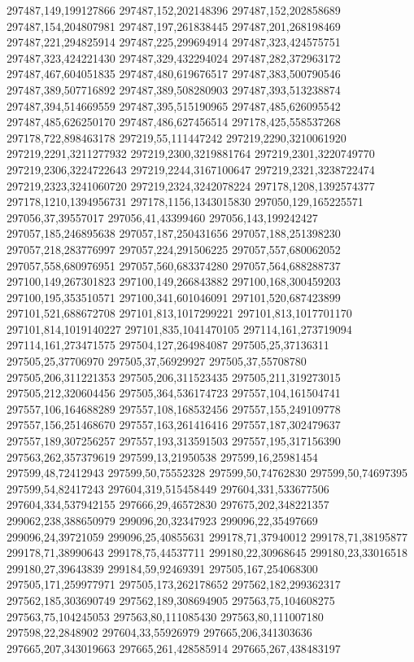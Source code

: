 297487,149,199127866
297487,152,202148396
297487,152,202858689
297487,154,204807981
297487,197,261838445
297487,201,268198469
297487,221,294825914
297487,225,299694914
297487,323,424575751
297487,323,424221430
297487,329,432294024
297487,282,372963172
297487,467,604051835
297487,480,619676517
297487,383,500790546
297487,389,507716892
297487,389,508280903
297487,393,513238874
297487,394,514669559
297487,395,515190965
297487,485,626095542
297487,485,626250170
297487,486,627456514
297178,425,558537268
297178,722,898463178
297219,55,111447242
297219,2290,3210061920
297219,2291,3211277932
297219,2300,3219881764
297219,2301,3220749770
297219,2306,3224722643
297219,2244,3167100647
297219,2321,3238722474
297219,2323,3241060720
297219,2324,3242078224
297178,1208,1392574377
297178,1210,1394956731
297178,1156,1343015830
297050,129,165225571
297056,37,39557017
297056,41,43399460
297056,143,199242427
297057,185,246895638
297057,187,250431656
297057,188,251398230
297057,218,283776997
297057,224,291506225
297057,557,680062052
297057,558,680976951
297057,560,683374280
297057,564,688288737
297100,149,267301823
297100,149,266843882
297100,168,300459203
297100,195,353510571
297100,341,601046091
297101,520,687423899
297101,521,688672708
297101,813,1017299221
297101,813,1017701170
297101,814,1019140227
297101,835,1041470105
297114,161,273719094
297114,161,273471575
297504,127,264984087
297505,25,37136311
297505,25,37706970
297505,37,56929927
297505,37,55708780
297505,206,311221353
297505,206,311523435
297505,211,319273015
297505,212,320604456
297505,364,536174723
297557,104,161504741
297557,106,164688289
297557,108,168532456
297557,155,249109778
297557,156,251468670
297557,163,261416416
297557,187,302479637
297557,189,307256257
297557,193,313591503
297557,195,317156390
297563,262,357379619
297599,13,21950538
297599,16,25981454
297599,48,72412943
297599,50,75552328
297599,50,74762830
297599,50,74697395
297599,54,82417243
297604,319,515458449
297604,331,533677506
297604,334,537942155
297666,29,46572830
297675,202,348221357
299062,238,388650979
299096,20,32347923
299096,22,35497669
299096,24,39721059
299096,25,40855631
299178,71,37940012
299178,71,38195877
299178,71,38990643
299178,75,44537711
299180,22,30968645
299180,23,33016518
299180,27,39643839
299184,59,92469391
297505,167,254068300
297505,171,259977971
297505,173,262178652
297562,182,299362317
297562,185,303690749
297562,189,308694905
297563,75,104608275
297563,75,104245053
297563,80,111085430
297563,80,111007180
297598,22,2848902
297604,33,55926979
297665,206,341303636
297665,207,343019663
297665,261,428585914
297665,267,438483197
